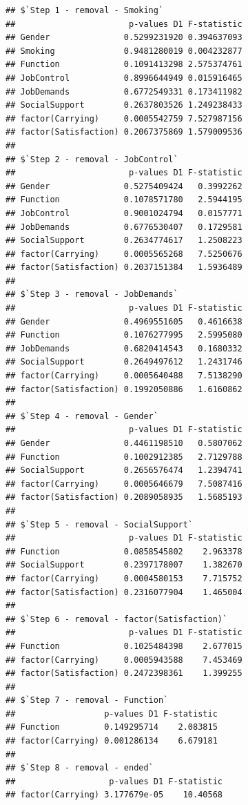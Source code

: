 \documentclass[
]{book}
\begin{document}
\begin{verbatim}
## $`Step 1 - removal - Smoking`
##                       p-values D1 F-statistic
## Gender               0.5299231920 0.394637093
## Smoking              0.9481280019 0.004232877
## Function             0.1091413298 2.575374761
## JobControl           0.8996644949 0.015916465
## JobDemands           0.6772549331 0.173411982
## SocialSupport        0.2637803526 1.249238433
## factor(Carrying)     0.0005542759 7.527987156
## factor(Satisfaction) 0.2067375869 1.579009536
## 
## $`Step 2 - removal - JobControl`
##                       p-values D1 F-statistic
## Gender               0.5275409424   0.3992262
## Function             0.1078571780   2.5944195
## JobControl           0.9001024794   0.0157771
## JobDemands           0.6776530407   0.1729581
## SocialSupport        0.2634774617   1.2508223
## factor(Carrying)     0.0005565268   7.5250676
## factor(Satisfaction) 0.2037151384   1.5936489
## 
## $`Step 3 - removal - JobDemands`
##                       p-values D1 F-statistic
## Gender               0.4969551605   0.4616638
## Function             0.1076277995   2.5995080
## JobDemands           0.6820414543   0.1680332
## SocialSupport        0.2649497612   1.2431746
## factor(Carrying)     0.0005640488   7.5138290
## factor(Satisfaction) 0.1992050886   1.6160862
## 
## $`Step 4 - removal - Gender`
##                       p-values D1 F-statistic
## Gender               0.4461198510   0.5807062
## Function             0.1002912385   2.7129788
## SocialSupport        0.2656576474   1.2394741
## factor(Carrying)     0.0005646679   7.5087416
## factor(Satisfaction) 0.2089058935   1.5685193
## 
## $`Step 5 - removal - SocialSupport`
##                       p-values D1 F-statistic
## Function             0.0858545802    2.963378
## SocialSupport        0.2397178007    1.382670
## factor(Carrying)     0.0004580153    7.715752
## factor(Satisfaction) 0.2316077904    1.465004
## 
## $`Step 6 - removal - factor(Satisfaction)`
##                       p-values D1 F-statistic
## Function             0.1025484398    2.677015
## factor(Carrying)     0.0005943588    7.453469
## factor(Satisfaction) 0.2472398361    1.399255
## 
## $`Step 7 - removal - Function`
##                  p-values D1 F-statistic
## Function         0.149295714    2.083815
## factor(Carrying) 0.001286134    6.679181
## 
## $`Step 8 - removal - ended`
##                   p-values D1 F-statistic
## factor(Carrying) 3.177679e-05    10.40568
\end{verbatim}
\end{document}
